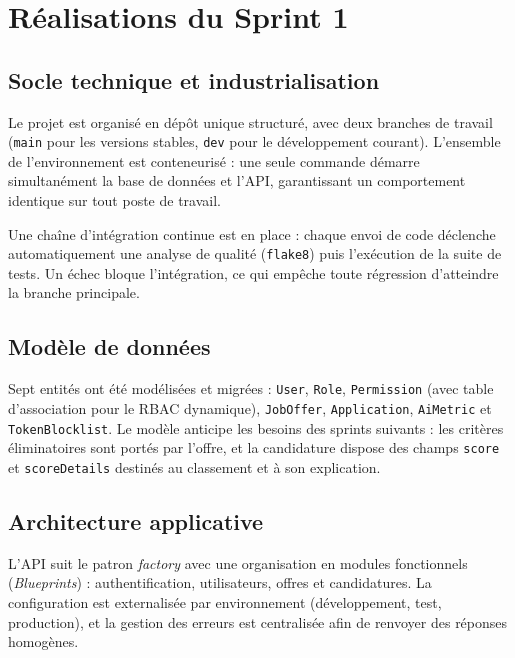 \documentclass[11pt,a4paper]{article}
\begin{document}
\section{Réalisations du Sprint 1}

\subsection{Socle technique et industrialisation}
Le projet est organisé en dépôt unique structuré, avec deux branches de travail (\texttt{main} pour les versions stables, \texttt{dev} pour le développement courant). L'ensemble de l'environnement est conteneurisé : une seule commande démarre simultanément la base de données et l'API, garantissant un comportement identique sur tout poste de travail.

Une chaîne d'intégration continue est en place : chaque envoi de code déclenche automatiquement une analyse de qualité (\texttt{flake8}) puis l'exécution de la suite de tests. Un échec bloque l'intégration, ce qui empêche toute régression d'atteindre la branche principale.

\subsection{Modèle de données}
Sept entités ont été modélisées et migrées : \texttt{User}, \texttt{Role}, \texttt{Permission} (avec table d'association pour le RBAC dynamique), \texttt{JobOffer}, \texttt{Application}, \texttt{AiMetric} et \texttt{TokenBlocklist}. Le modèle anticipe les besoins des sprints suivants : les critères éliminatoires sont portés par l'offre, et la candidature dispose des champs \texttt{score} et \texttt{scoreDetails} destinés au classement et à son explication.

\subsection{Architecture applicative}
L'API suit le patron \emph{factory} avec une organisation en modules fonctionnels (\emph{Blueprints}) : authentification, utilisateurs, offres et candidatures. La configuration est externalisée par environnement (développement, test, production), et la gestion des erreurs est centralisée afin de renvoyer des réponses homogènes.
\end{document}
